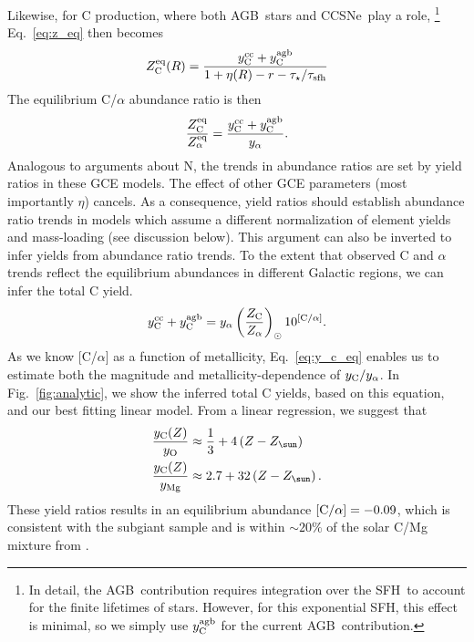 \documentclass[fleqn,usenatbib]{mnras}
\newcommand{\agb}{AGB}
\newcommand{\cc}{CCSNe}
\newcommand{\gce}{GCE}
\newcommand{\sfh}{SFH}
\newcommand{\Yct}{\ensuremath{y_{\rm C}}}
\newcommand{\Ycc}{\ensuremath{y_{\rm C}^{\rm cc}}}
\newcommand{\Ycagb}{\ensuremath{y_{\rm C}^{\rm agb}}}
\newcommand{\Zo}{%
    \ifmmode Z_{\sun}%
    \else $Z_{\sun}$%
    \fi}
\newcommand{\about}[1]{${\sim} #1$}
\begin{document}
Likewise, for C production, where both \agb\ stars and \cc\ play a role,%
\footnote{In detail, the \agb\ contribution requires integration over the \sfh\ to account for the finite lifetimes of stars. However, for this exponential \sfh, this effect is minimal, so we simply use $\Ycagb$ for the current \agb\ contribution.}
Eq.~\ref{eq:z_eq} then becomes
\begin{equation}
    Z_{\rm C}^{\rm eq}(R) = \frac{\Ycc + \Ycagb}{1 + \eta(R) - r - \tau_\star / \tau_{\rm sfh}}
\end{equation}
The equilibrium C/$\alpha$ abundance ratio is then
\begin{equation}\label{eq:z_co}
    \frac{Z_{\rm C}^{\rm eq}}{Z_\alpha^{\rm eq}} = \frac{\Ycc + \Ycagb }{y_\alpha}.
\end{equation}
Analogous to \cite{james+23} arguments about N, the trends in abundance ratios are set by yield ratios in these \gce{} models. The effect of other \gce{} parameters (most importantly $\eta$) cancels. As a consequence, yield ratios should establish abundance ratio trends in models which assume a different normalization of element yields and mass-loading (see discussion below).
This argument can also be inverted to infer  yields from abundance ratio trends. To the extent that observed C and $\alpha$ trends reflect the equilibrium abundances in different Galactic regions, we can infer the total C yield.
\begin{equation}\label{eq:y_c_eq}
    \Ycc + \Ycagb =  y_\alpha \left(\frac{Z_{\rm C}}{Z_{\alpha}}\right)_\odot 10^{[{\rm C}/\alpha]}.
\end{equation}
As we know [C/$\alpha$] as a function of metallicity, Eq.~\ref{eq:y_c_eq} enables us to estimate both the magnitude and metallicity-dependence of $\Yct/y_\alpha$.
In Fig.~\ref{fig:analytic}, we show the inferred total C yields, based on this equation, and our best fitting linear model. From a linear regression, we suggest that
\begin{subequations}\label{eq:yc_inferred}
    \begin{align}
        \frac{\Yct(Z)}{y_{\rm O}} &\approx \frac{1}{3} + 4 \left(Z-\Zo\right) \\
        \frac{\Yct(Z)}{y_{\rm Mg}} &\approx 2.7 + 32 \left(Z-\Zo\right).
    \end{align}
\end{subequations}
These yield ratios results in an equilibrium abundance $[{\rm C}/\alpha] = -0.09$, which is consistent with the subgiant sample and is within \about{20\%} of the solar C/Mg mixture from \citet{asplund+09}.
\end{document}
